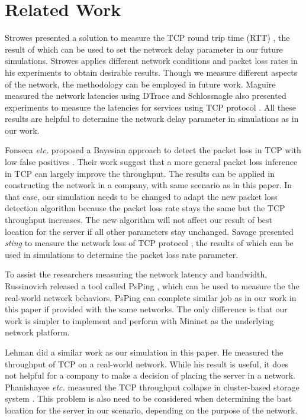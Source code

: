 \section{Related Work} \label{sec:related}

Strowes presented a solution to measure the TCP round trip time (RTT) \cite{Strowes:2013},
the result of which can be used to set the network delay parameter in our future simulations. 
Strowes applies different network conditions and packet loss rates in his experiments to 
obtain desirable results. Though we measure different aspects of the network, the methodology
can be employed in future work. Maguire measured the network latencies using DTrace \cite{Maguire:2010}
and Schlossnagle also presented experiments to measure the latencies
for services using TCP protocol \cite{Schlossnagle:2013}. 
All these results are helpful to determine the network delay parameter in simulations 
as in our work.

Fonseca {\it etc.} proposed a Bayesian approach to detect the packet loss in
TCP with low false positives \cite{FonsecaCrovella:Infocom05}. Their work suggest
that a more general packet loss inference in TCP can largely improve the throughput.
The results can be applied in constructing the network in a company, with same 
scenario as in this paper. In that case, our simulation needs to be changed
to adapt the new packet loss detection algorithm because the packet loss rate 
stays the same but the TCP throughput increases. The new algorithm will not 
affect our result of best location for the server if all other parameters 
stay unchanged. Savage presented {\it sting} to measure the network loss of TCP
protocol \cite{Savage:1999}, the results of which can be used in simulations to determine the 
packet loss rate parameter. 

To assist the researchers
measuring the network latency and bandwidth, Russinovich released a tool called PsPing
\cite{PsPing:tool}, which can be used to measure the the real-world network behaviors. 
PsPing can complete similar job as in our work in this paper if provided with the same  
networks. The only difference is that our work is simpler to implement and 
perform with Mininet as the underlying network platform. 

Lehman did a similar work  \cite{Lehman:2001} as our simulation in this paper.
He measured the throughput of TCP on a real-world network. While his result is
useful, it does not helpful for a company to make a decision of placing the 
server in a network. Phanishayee {\it etc.} measured the TCP throughput collapse in cluster-based
storage system \cite{Phanishayee:2008}. This problem is also need to 
be considered when determining the bast location for the server in our
scenario, depending on the purpose of the network.